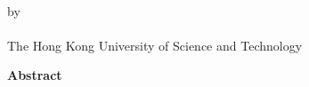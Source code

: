 \begin{center}
{\Large \thesistitle}\\
\vspace{20mm}
by \thesisauthor\\
\departmentname\\
The Hong Kong University of Science and Technology
\end{center}
\vspace{8mm}
\begin{center}
\textbf{Abstract}
\end{center}
\par
\noindent



